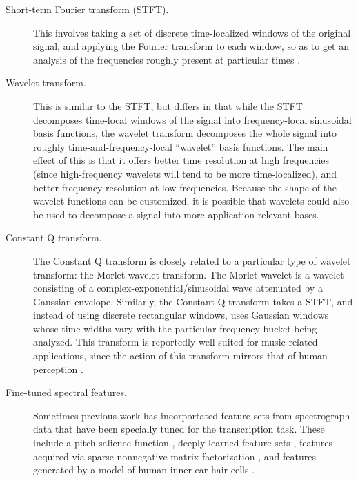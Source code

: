 \documentclass{article}
\begin{document}
\begin{description}
\item[Short-term Fourier transform (STFT).]
  This involves taking a set of discrete time-localized windows of the original
  signal, and applying the Fourier transform to each window, so as to get an
  analysis of the frequencies roughly present at particular times
  \cite{bock2012polyphonic} \cite{poliner2006discriminative}.
\item[Wavelet transform.]
  This is similar to the STFT, but differs in that while the STFT decomposes
  time-local windows of the signal into frequency-local sinusoidal basis
  functions, the wavelet transform decomposes the whole signal into roughly
  time-and-frequency-local ``wavelet'' basis functions. The main effect of this
  is that it offers better time resolution at high frequencies (since
  high-frequency wavelets will tend to be more time-localized), and better
  frequency resolution at low frequencies. Because the shape of the wavelet
  functions can be customized, it is possible that wavelets could also be used
  to decompose a signal into more application-relevant bases.
\item[Constant Q transform.] 
  The Constant Q transform is closely related to a particular type of wavelet
  transform: the Morlet wavelet transform. The Morlet wavelet is a wavelet
  consisting of a complex-exponential/sinusoidal wave attenuated by a
  Gaussian envelope. Similarly, the Constant Q transform takes a STFT, and
  instead of using discrete rectangular windows, uses Gaussian windows whose
  time-widths vary with the particular frequency bucket being analyzed.
  This transform is reportedly well suited for music-related applications,
  since the action of this transform mirrors that of human perception
  \cite{5946322} \cite{costantini2013nmf}.
\item[Fine-tuned spectral features.]
  Sometimes previous work has incorportated feature sets from spectrograph
  data that have been specially tuned for the transcription task.
  These include a pitch salience function \cite{5946322}, deeply learned
  feature sets \cite{nam2011classification}, features acquired via sparse
  nonnegative matrix factorization \cite{costantini2013nmf}, and features
  generated by a model of human inner ear hair cells 
  \cite{marolt2004connectionist}. 
\end{description}
\end{document}
